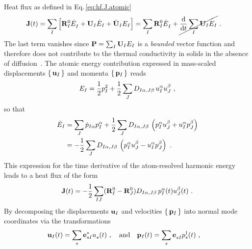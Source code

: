 Heat flux as defined in Eq.\,\eqref{eq:hf.J.atomic}
\begin{align}
	\b J (t) 
		&= \sum_I \left[ \b R_I^0 \fD{\dot{E}}_I + \b U_I \dot{E}_I + \dot{\b U}_I E_I\right]
		= \sum_I \b R_I^0 \fD{\dot{E}}_I + \cancel{\frac{\d}{\d t} \sum_I \b U_I E_I}~.
		\label{eq:J(t)}
\end{align}
The last term vanishes since ${\bf P} = \sum_I {\bf U}_I E_I$ is a \emph{bounded} vector function and therefore does not contribute to the thermal conductivity in solids in the absence of diffusion~.
The atomic energy contribution expressed in mass-scaled displacements $\set{{\bf u}_I}$ and momenta $\set{{\bf p}_I}$ reads
\begin{align}
	E_I = \frac{1}{2} p_I^2 + \frac{1}{2} \sum_J D_{I \alpha , J \beta} \, u_I^\alpha u_J^\beta~,
\end{align}
so that
\begin{align}
	\dot E_I 
		&= \sum_J \dot{p}_{I\alpha} p_I^\alpha 
		+ \halb \sum_J D_{I \alpha , J \beta} \, 
			\left( p_I^\alpha u_J^\beta + u_I^\alpha p_J^\beta\right) \nonumber \\ 
		&= -\halb \sum_J D_{I \alpha , J \beta} \, 
		\left( p_I^\alpha u_J^\beta - u_I^\alpha p_J^\beta\right) ~.
		\label{eq:dotE_I}
\end{align}
This expression for the time derivative of the atom-resolved harmonic energy leads to a heat flux of the form
\begin{align}
    {\bf J} (t) = -\frac{1}{2} \sum_{IJ} ({\bf R}_I^0 - {\bf R}_J^0) D_{I \alpha, J \beta} \, p_I^\alpha (t) u_J^\beta (t)~.
\end{align}
By decomposing the displacements ${{\bf u}_I}$ and velocities $\set{{\bf p}_I}$ into normal mode coordinates via the transformations
\begin{align}
    \b u_I (t) 
	    &= \sum_s \b e^\ast_{s I} \fD u_s (t)~,\quad\text{and}\quad	\b p_I (t) = \sum_s \fD{\b e}_{s I} \D{p}_s (t)~,
\end{align}
